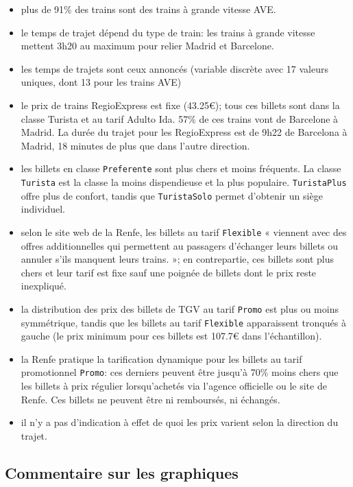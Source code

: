 \documentclass[
  11pt,
  letterpaper,
]{book}
\providecommand{\tightlist}{%
  \setlength{\itemsep}{0pt}\setlength{\parskip}{0pt}}\usepackage{longtable,booktabs,array}
\theoremstyle{definition}
\theoremstyle{remark}
\begin{document}
\begin{itemize}
\tightlist
\item
  plus de 91\% des trains sont des trains à grande vitesse AVE.
\item
  le temps de trajet dépend du type de train: les trains à grande
  vitesse mettent 3h20 au maximum pour relier Madrid et Barcelone.
\item
  les temps de trajets sont ceux annoncés (variable discrète avec 17
  valeurs uniques, dont 13 pour les trains AVE)
\item
  le prix de trains RegioExpress est fixe (43.25€); tous ces billets
  sont dans la classe Turista et au tarif Adulto Ida. 57\% de ces trains
  vont de Barcelone à Madrid. La durée du trajet pour les RegioExpress
  est de 9h22 de Barcelona à Madrid, 18 minutes de plus que dans l'autre
  direction.
\item
  les billets en classe \texttt{Preferente} sont plus chers et moins
  fréquents. La classe \texttt{Turista} est la classe la moins
  dispendieuse et la plus populaire. \texttt{TuristaPlus} offre plus de
  confort, tandis que \texttt{TuristaSolo} permet d'obtenir un siège
  individuel.
\item
  selon le site web de la Renfe, les billets au tarif \texttt{Flexible}
  « viennent avec des offres additionnelles qui permettent au passagers
  d'échanger leurs billets ou annuler s'ils manquent leurs trains. »; en
  contrepartie, ces billets sont plus chers et leur tarif est fixe sauf
  une poignée de billets dont le prix reste inexpliqué.
\item
  la distribution des prix des billets de TGV au tarif \texttt{Promo}
  est plus ou moins symmétrique, tandis que les billets au tarif
  \texttt{Flexible} apparaissent tronqués à gauche (le prix minimum pour
  ces billets est 107.7€ dans l'échantillon).
\item
  la Renfe pratique la tarification dynamique pour les billets au tarif
  promotionnel \texttt{Promo}: ces derniers peuvent être jusqu'à 70\%
  moins chers que les billets à prix régulier lorsqu'achetés via
  l'agence officielle ou le site de Renfe. Ces billets ne peuvent être
  ni remboursés, ni échangés.
\item
  il n'y a pas d'indication à effet de quoi les prix varient selon la
  direction du trajet.
\end{itemize}

\hypertarget{commentaire-sur-les-graphiques}{%
\subsection{Commentaire sur les
graphiques}\label{commentaire-sur-les-graphiques}}
\end{document}
